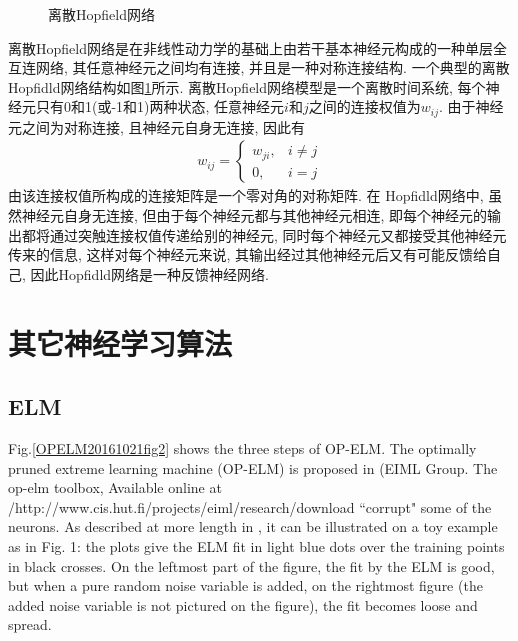 \begin{figure}[H]
\begin{center}
\caption{离散Hopfield网络}
\label{AI32fig201912022608}
\end{center}
\end{figure}
离散Hopfield网络是在非线性动力学的基础上由若干基本神经元构成的一种单层全互连网络, 其任意神经元之间均有连接, 并且是一种对称连接结构. 一个典型的离散 Hopfidld网络结构如图\ref{AI32fig201912022608}所示. 离散Hopfield网络模型是一个离散时间系统, 每个神经元只有0和1(或-1和1)两种状态, 任意神经元$i$和$j$之间的连接权值为$w_{ij}$. 由于神经元之间为对称连接, 且神经元自身无连接, 因此有
\begin{align}
  w_{i j}=\left\{
  \begin{array}{ll}
  {w_{j i}}, & i \neq j \\
    {0}, &  i=j
    \end{array}\right.
\end{align}
由该连接权值所构成的连接矩阵是一个零对角的对称矩阵. 在 Hopfidld网络中, 虽然神经元自身无连接, 但由于每个神经元都与其他神经元相连, 即每个神经元的输出都将通过突触连接权值传递给别的神经元, 同时每个神经元又都接受其他神经元传来的信息, 这样对每个神经元来说, 其输出经过其他神经元后又有可能反馈给自己, 因此Hopfidld网络是一种反馈神经网络.
\section{其它神经学习算法}
\subsection{ELM}
Fig.\ref{OPELM20161021fig2} shows the three steps of OP-ELM. The optimally pruned extreme learning machine (OP-ELM) is proposed in (EIML Group. The op-elm toolbox, Available online at /http://www.cis.hut.fi/projects/eiml/research/download ``corrupt" some of the neurons. As described at more length in \cite{Miche2008OP, Miche2008A, Miche2010OP}, it can be illustrated on a toy example as in Fig. 1: the plots give the ELM fit in light blue dots over the training points in black crosses. On the leftmost part of the figure,
the fit by the ELM is good, but when a pure random noise variable is added, on the rightmost figure (the added noise variable is not pictured on the figure), the fit becomes loose and spread.

